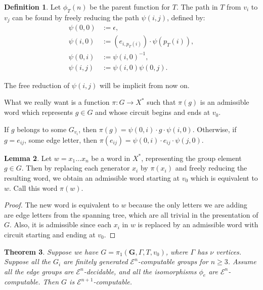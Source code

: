 \documentclass[a4paper]{article}
\newcommand{\grz}[1]{$\mathcal{E}^{#1}$}	%
\newcommand{\fgoagog}{\pi_1(\mathbf{G},\Gamma,T,v_0)}	%
\theoremstyle{plain}
\newtheorem{theorem}{Theorem}[section]
\theoremstyle{definition}
\newtheorem{lemma}[theorem]{Lemma}
\newtheorem{definition}[theorem]{Definition}
\begin{document}
\begin{definition}
Let $\phi_T(n)$ be the parent function for $T$. The path in $T$ from $v_i$ to $v_j$ can be found by freely reducing the path $\psi(i,j)$, defined by:
\begin{equation}\begin{split}
\psi(0,0) &:= \epsilon, \\
\psi(i,0) &:= (e_{i,p_T(i)}) \cdot \psi(p_T(i)), \\
\psi(0,i) &:= \psi(i,0)^{-1}, \\
\psi(i,j) &:= \psi(i,0) \psi(0,j).
\end{split}\end{equation}

The free reduction of $\psi(i,j)$ will be implicit from now on.

What we really want is a function $\pi:G \rightarrow X^{\ast}$ such that $\pi(g)$ is an admissible word which represents $g \in G$ and whose circuit begins and ends at $v_0$.

If $g$ belongs to some $G_{v_i}$, then $\pi(g) = \psi(0,i) \cdot g \cdot \psi(i,0)$. Otherwise, if $g = e_{ij}$, some edge letter, then $\pi(e_{ij}) = \psi(0,i) \cdot e_{ij} \cdot \psi(j,0)$.
\end{definition}

\begin{lemma}
	Let $w = x_1 \dots x_n$ be a word in $X^{\ast}$, representing the group element $g \in G$. Then by replacing each generator $x_i$ by $\pi(x_i)$ and freely reducing the resulting word, we obtain an admissible word starting at $v_0$ which is equivalent to $w$. Call this word $\pi(w)$.
\end{lemma}

\begin{proof}
The new word is equivalent to $w$ because the only letters we are adding are edge letters from the spanning tree, which are all trivial in the presentation of $G$. Also, it is admissible since each $x_i$ in $w$ is replaced by an admissible word with circuit starting and ending at $v_0$.
\end{proof}

\begin{theorem} \label{fgoagogcomp}
Suppose we have $G = \fgoagog$, where $\Gamma$ has $\nu$ vertices. Suppose 
all the $G_i$ are finitely generated \grz{n}-computable groups for $n \geq 3$. Assume all the edge groups are \grz{n}-decidable, and all the isomorphisms $\phi_e$ are \grz{n}-computable. Then $G$ is \grz{n+1}-computable.
\end{theorem}
\end{document}
